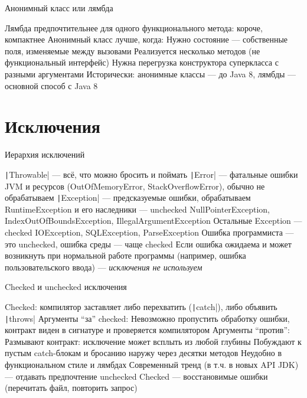 \documentclass{../../slides-style}
\begin{document}
    \begin{frame}{Анонимный класс или лямбда}
        \begin{outline}
            \1 Лямбда предпочтительнее для одного функционального метода: короче, компактнее
            \1 Анонимный класс лучше, когда:
                \2 Нужно состояние --- собственные поля, изменяемые между вызовами
                \2 Реализуется несколько методов (не функциональный интерфейс)
                \2 Нужна перегрузка конструктора суперкласса с разными аргументами
            \1 Исторически: анонимные классы --- до Java 8, лямбды --- основной способ с Java 8
        \end{outline}
    \end{frame}

    \section{Исключения}

    \begin{frame}{Иерархия исключений}
        \begin{outline}
            \1 \texttt|Throwable| --- всё, что можно бросить и поймать
                \2 \texttt|Error| --- фатальные ошибки JVM и ресурсов (OutOfMemoryError, StackOverflowError), обычно не обрабатываем
                \2 \texttt|Exception| --- предсказуемые ошибки, обрабатываем
            \1 RuntimeException и его наследники --- unchecked
                \2 NullPointerException, IndexOutOfBoundsException, IllegalArgumentException
            \1 Остальные Exception --- checked
                \2 IOException, SQLException, ParseException
            \1 Ошибка программиста --- это unchecked, ошибка среды --- чаще checked
            \1 Если ошибка ожидаема и может возникнуть при нормальной работе программы (например, ошибка пользовательского ввода) --- \emph{исключения не используем}
        \end{outline}
    \end{frame}

    \begin{frame}{Checked и unchecked исключения}
        \begin{outline}
            \1 Checked: компилятор заставляет либо перехватить (\texttt|catch|), либо объявить \texttt|throws|
            \1 Аргументы \enquote{за} checked:
                \2 Невозможно пропустить обработку ошибки, контракт виден в сигнатуре и проверяется компилятором
            \1 Аргументы \enquote{против}:
                \2 Размывают контракт: исключение может всплыть из любой глубины
                \2 Побуждают к пустым catch-блокам и бросанию наружу через десятки методов
                \2 Неудобно в функциональном стиле и лямбдах
            \1 Современный тренд (в т.ч. в новых API JDK) --- отдавать предпочтение unchecked
            \1 Checked --- восстановимые ошибки (перечитать файл, повторить запрос)
        \end{outline}
    \end{frame}
\end{document}
